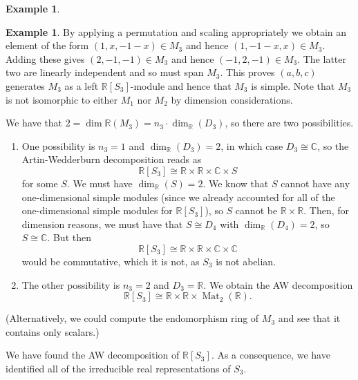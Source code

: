 \documentclass{amsart}[12pt]
\def\End{\operatorname{End}}
\def\Mat{\operatorname{Mat}}
\def\a{\alpha}
\newcommand{\R}{{\mathbb{R}}}
\newcommand{\C}{\mathbb{C}}
\numberwithin{equation}{section}
\theoremstyle{plain} %
\theoremstyle{definition}
\newtheorem{ex}[equation]{Example}
\theoremstyle{remark}
\begin{document}
\begin{ex}
\begin{ex}
By applying a permutation and scaling appropriately we obtain an
element of the form $(1,x,-1-x) \in M_3$ and hence $(1, -1-x, x) \in M_3$. Adding these gives $(2,-1,-1) \in M_3$ and
hence $(-1, 2,-1) \in M_3$. The latter two are linearly independent and so must span $M_3$. This proves $(a,b,c)$ generates $M_3$ as a left $\R[S_3]$-module
and hence that $M_3$ is simple.
Note that $M_3$ is not isomorphic to either $M_1$ nor $M_2$ by dimension considerations.

We have that $2=\dim{\R}(M_3) = n_3 \cdot \dim_{\R}(D_3)$, so there are two possibilities.

\begin{enumerate}
\item One possibility is $n_3=1$ and $\dim_{\R}(D_3)=2$, in which case $D_3\cong \C$, so the Artin-Wedderburn decomposition reads as
\[ \R[S_3] \cong \R \times \R \times \C \times S\] 
for some $S$. We must have $\dim_{\R}(S)=2$. We know that $S$ cannot have any one-dimensional simple modules (since we already accounted for all of the one-dimensional simple modules for $\R[S_3]$), so $S$ cannot be $\R \times \R$. Then, for dimension reasons, we must have that $S\cong D_4$ with $\dim_{\R}(D_4)=2$, so $S\cong \C$. But then
\[ \R[S_3] \cong \R \times \R \times \C \times \C\] 
would be commutative, which it is not, as $S_3$ is not abelian.
\item The other possibility is $n_3=2$ and $D_3=\R$. We obtain the AW decomposition
\[ \R[S_3] \cong \R \times\R \times \Mat_2(\R).\]
\end{enumerate}

(Alternatively, we could compute the endomorphism ring of $M_3$ and see that it contains only scalars.)

We have found the AW decomposition of $\R[S_3]$. As a consequence, we have identified all of the irreducible real representations of $S_3$.
\end{ex}






\end{ex}
\end{document}
